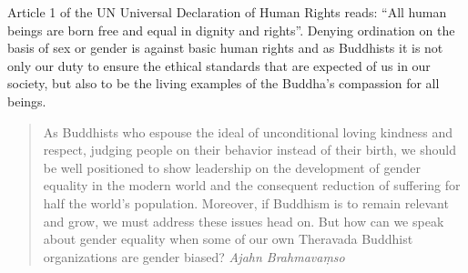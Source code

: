 Article 1 of the UN Universal Declaration of Human Rights reads: ``All human beings are born free and equal in dignity and rights''. Denying ordination on the basis of sex or gender is against basic human rights and as Buddhists it is not only our duty to ensure the ethical standards that are expected of us in our society, but also to be the living examples of the Buddha's compassion for all beings.

\begin{quote}
As Buddhists who espouse the ideal of unconditional loving kindness and respect, judging people on their behavior instead of their birth, we should be well positioned to show leadership on the development of gender equality in the modern world and the consequent reduction of suffering for half the world’s population. Moreover, if Buddhism is to remain relevant and grow, we must address these issues head on. But how can we speak about gender equality when some of our own Theravada Buddhist organizations are gender biased? {\em Ajahn Brahmavaṃso}
\end{quote}
